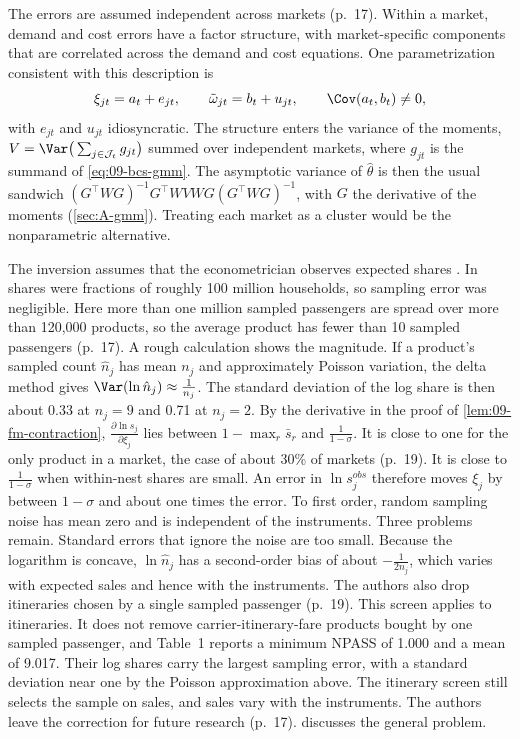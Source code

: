 The errors are assumed independent across markets (p.~17). Within a market, demand and cost errors have a
factor structure, with market-specific components that are correlated across the demand and cost
equations. One parametrization consistent with this description is
\begin{equation}\label{eq:09-bcs-factor}
\xi_{jt}=a_t+e_{jt},\qquad \tilde\omega_{jt}=b_t+u_{jt},\qquad \Cov(a_t,b_t)\ne0,
\end{equation}
with $e_{jt}$ and $u_{jt}$ idiosyncratic. The structure enters the variance of the moments,
$V=\Var\big(\sum_{j\in\mathcal{J}_t}g_{jt}\big)$ summed over independent markets, where $g_{jt}$ is the
summand of \eqref{eq:09-bcs-gmm}. The asymptotic variance of $\hat\theta$ is then the usual sandwich
$(G^\top WG)^{-1}G^\top WVWG(G^\top WG)^{-1}$, with $G$ the derivative of the moments
(\cref{sec:A-gmm}). Treating each market as a cluster would be the nonparametric alternative.

The inversion assumes that the econometrician observes expected shares \citep{Berry1994}. In
\citet{BerryLevinsohnPakes1995} shares were fractions of roughly 100 million households, so sampling error
was negligible. Here more than one million sampled passengers are spread over more than 120,000 products,
so the average product has fewer than 10 sampled passengers (p.~17). A rough calculation shows the
magnitude. If a product's sampled count $\hat n_j$ has mean $n_j$ and approximately Poisson variation, the
delta method gives $\Var(\ln\hat n_j)\approx\frac{1}{n_j}$. The standard deviation of the log share is then
about 0.33 at $n_j=9$ and 0.71 at $n_j=2$. By the derivative in the proof of
\cref{lem:09-fm-contraction}, $\frac{\partial\ln s_j}{\partial\xi_j}$ lies between $1-\max_r\bar s_r$ and
$\frac{1}{1-\sigma}$. It is close to one for the only product in a market, the case of about 30\% of markets
(p.~19). It is close to $\frac{1}{1-\sigma}$ when within-nest shares are small. An error in
$\ln s^{obs}_j$ therefore moves $\xi_j$ by between $1-\sigma$ and about one times the error. To first
order, random sampling noise has mean zero and is independent of the instruments. Three problems remain.
Standard errors that ignore the noise are too small. Because the logarithm is concave, $\ln\hat n_j$ has a
second-order bias of about $-\frac{1}{2n_j}$, which varies with expected sales and hence with the
instruments. The authors also drop itineraries chosen by a single sampled passenger (p.~19). This screen
applies to itineraries. It does not remove carrier-itinerary-fare products bought by one sampled passenger,
and Table~1 reports a minimum NPASS of 1.000 and a mean of 9.017. Their log shares carry the
largest sampling error, with a standard deviation near one by the Poisson approximation above. The itinerary
screen still selects the sample on sales, and sales vary with the instruments. The authors
leave the correction for future research (p.~17).  discusses the general problem.

